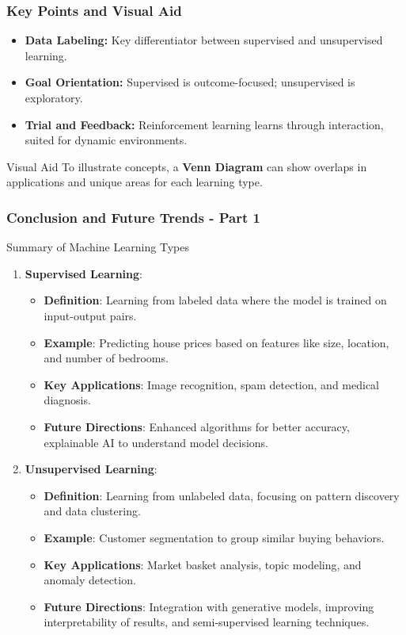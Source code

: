 \documentclass{beamer}
\begin{document}
\begin{frame}[fragile]
    \frametitle{Key Points and Visual Aid}
    \begin{itemize}
        \item \textbf{Data Labeling:} Key differentiator between supervised and unsupervised learning.
        \item \textbf{Goal Orientation:} Supervised is outcome-focused; unsupervised is exploratory.
        \item \textbf{Trial and Feedback:} Reinforcement learning learns through interaction, suited for dynamic environments.
    \end{itemize}
    
    \begin{block}{Visual Aid}
        To illustrate concepts, a \textbf{Venn Diagram} can show overlaps in applications and unique areas for each learning type.
    \end{block}
\end{frame}

\begin{frame}[fragile]
    \frametitle{Conclusion and Future Trends - Part 1}
    \begin{block}{Summary of Machine Learning Types}
        \begin{enumerate}
            \item \textbf{Supervised Learning}:
            \begin{itemize}
                \item \textbf{Definition}: Learning from labeled data where the model is trained on input-output pairs.
                \item \textbf{Example}: Predicting house prices based on features like size, location, and number of bedrooms.
                \item \textbf{Key Applications}: Image recognition, spam detection, and medical diagnosis.
                \item \textbf{Future Directions}: Enhanced algorithms for better accuracy, explainable AI to understand model decisions.
            \end{itemize}

            \item \textbf{Unsupervised Learning}:
            \begin{itemize}
                \item \textbf{Definition}: Learning from unlabeled data, focusing on pattern discovery and data clustering.
                \item \textbf{Example}: Customer segmentation to group similar buying behaviors.
                \item \textbf{Key Applications}: Market basket analysis, topic modeling, and anomaly detection.
                \item \textbf{Future Directions}: Integration with generative models, improving interpretability of results, and semi-supervised learning techniques.
            \end{itemize}
        \end{enumerate}
    \end{block}
\end{frame}
\end{document}
